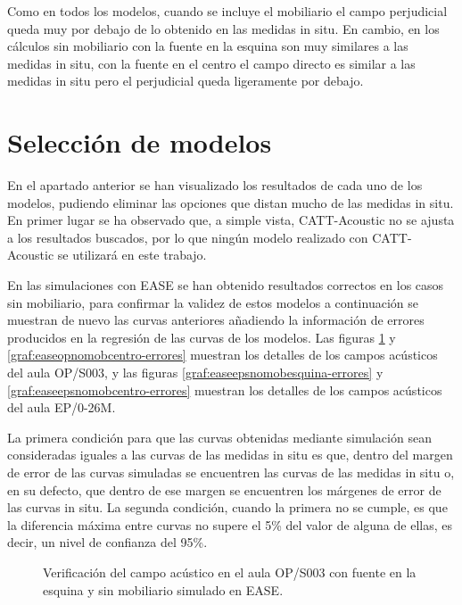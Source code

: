 Como en todos los modelos, cuando se incluye el mobiliario el campo perjudicial queda muy por debajo de lo obtenido en las medidas in situ. En cambio, en los cálculos sin mobiliario con la fuente en la esquina son muy similares a las medidas in situ, con la fuente en el centro el campo directo es similar a las medidas in situ pero el perjudicial queda ligeramente por debajo.

\section{Selección de modelos}
\label{modelosvalidados}
En el apartado anterior se han visualizado los resultados de cada uno de los modelos, pudiendo eliminar las opciones que distan mucho de las medidas in situ.
En primer lugar se ha observado que, a simple vista, CATT-Acoustic no se ajusta a los resultados buscados, por lo que ningún modelo realizado con CATT-Acoustic se utilizará en este trabajo.

En las simulaciones con EASE se han obtenido resultados correctos en los casos sin mobiliario, para confirmar la validez de estos modelos a continuación se muestran de nuevo las curvas anteriores añadiendo la información de errores producidos en la regresión de las curvas de los modelos. Las figuras \ref{graf:easeopnomobesquina-errores} y \ref{graf:easeopnomobcentro-errores} muestran los detalles de los campos acústicos del aula OP/S003, y las figuras \ref{graf:easeepsnomobesquina-errores} y \ref{graf:easeepsnomobcentro-errores} muestran los detalles de los campos acústicos del aula EP/0-26M.


La primera condición para que las curvas obtenidas mediante simulación sean consideradas iguales a las curvas de las medidas in situ es que, dentro del margen de error de las curvas simuladas se encuentren las curvas de las medidas in situ o, en su defecto, que dentro de ese margen se encuentren los márgenes de error de las curvas in situ. La segunda condición, cuando la primera no se cumple, es que la diferencia máxima entre curvas no supere el 5\% del valor de alguna de ellas, es decir, un nivel de confianza del 95\%.
\begin{figure}[ht]
	\centering%
     {%
    }
    \caption{Verificación del campo acústico en el aula OP/S003 con fuente en la esquina y sin mobiliario simulado en EASE.}%
     \label{graf:easeopnomobesquina-errores}%
\end{figure}

